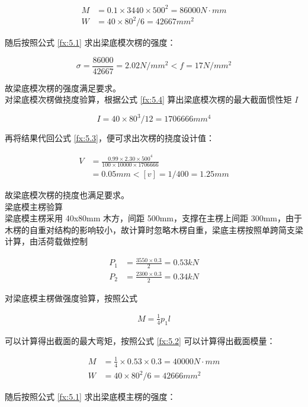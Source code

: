 \begin{align*}
    M&=0.1\times 3440\times 500^2=86000 N \cdot mm\\
    W&=40\times 80^2 /6=42667 mm^2
\end{align*}

随后按照公式 \ref{fx:5.1} 求出梁底模次楞的强度：

\[
    \sigma = \frac{86000}{42667}=2.02 N/mm^2< f=17N/mm^2
\]

故梁底模次楞的强度满足要求。\\

对梁底模次楞做挠度验算，根据公式 \ref{fx:5.4} 算出梁底模次楞的最大截面惯性矩 $I$

\[
    I=40\times 80^3 /12=1706666 mm^4
\]

再将结果代回公式 \ref{fx:5.3}，便可求出次楞的挠度设计值：

\begin{align*}
    V&=\frac{0.99\times 2.30 \times 500^4}{100\times 10000\times 1706666}\\
    &=0.05 mm<[v]=1/400=1.25mm
\end{align*}

故梁底模次楞的挠度也满足要求。\\

 梁底模主楞验算\\

梁底模主楞采用 40x80mm 木方，间距 500mm，支撑在主楞上间距 300mm，由于木楞的自重对结构的影响较小，故计算时忽略木楞自重，梁底主楞按照单跨简支梁计算，由活荷载做控制

\begin{align*}    P_1&=\frac{3550\times 0.3}{2}=0.53 kN\\
    P_2&=\frac{2300\times 0.3}{2}=0.34 kN
\end{align*}

对梁底模主楞做强度验算，按照公式

\begin{align}
    \label{fx:5.A}
    M=\frac{1}{4}p_1l
\end{align}

可以计算得出截面的最大弯矩，按照公式 \ref{fx:5.2} 可以计算得出截面模量：

\begin{align*}
    M&=\frac{1}{4}\times 0.53\times 0.3=40000 N \cdot mm\\
    W&=40\times 80^2 /6=42666 mm^2
\end{align*}

随后按照公式 \ref{fx:5.1} 求出梁底模主楞的强度：


